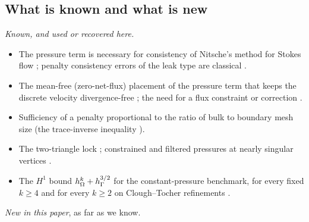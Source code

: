 \subsection{What is known and what is new}
\emph{Known, and used or recovered here.}
\begin{itemize}
\item The pressure term is necessary for consistency of Nitsche's method for Stokes flow \cite{BurmanHansboLarson2019Stokes}; penalty consistency errors of the leak type are classical \cite{Babuska1973}.
\item The mean-free (zero-net-flux) placement of the pressure term that keeps the discrete velocity divergence-free \cite{FrachonNilssonZahedi2024}; the need for a flux constraint or correction \cite{LiuNeilanOtus2023,EickmannScottTscherpel2025}.
\item Sufficiency of a penalty proportional to the ratio of bulk to boundary mesh size (the trace-inverse inequality \cite{Stenberg1995,JuntunenStenberg2009}).
\item The two-triangle lock \cite{ScottPrize,GjerdeScott2024}; constrained and filtered pressures at nearly singular vertices \cite{GrassleBohneSauter2024,Park2020,BohneGrassleSauter2025}.
\item The $H^1$ bound $h_\Omega^k+h_\Gamma^{3/2}$ for the constant-pressure benchmark, for every fixed $k\ge4$ and for every $k\ge2$ on Clough--Tocher refinements \cite[Thm.~5.2, Cor.~5.3]{Cavalcante}.
\end{itemize}
\emph{New in this paper}, as far as we know.
